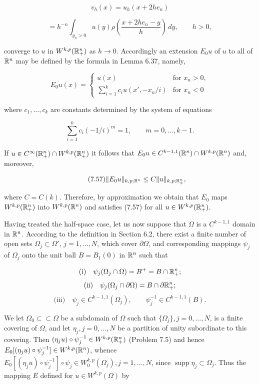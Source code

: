 \begin{equation}
\tag{7.55}
v_h(x) = u_h(x + 2he_n)
\end{equation}

\[
= h^{-n}\int_{y_n > 0} u(y)\rho\!\left(\frac{x + 2he_n - y}{h}\right)\,dy,\qquad h > 0,
\]

converge to $u$ in $W^{k,p}(\mathbb{R}_+^n)$ as $h \to 0$. Accordingly an extension $E_0u$ of $u$ to all of $\mathbb{R}^n$ may be defined by the formula in Lemma 6.37, namely,

\begin{equation}
\tag{7.56}
E_0u(x) =
\begin{cases}
u(x) & \text{for } x_n > 0,\\
\sum_{i=1}^k c_i u(x',-x_n/i) & \text{for } x_n < 0
\end{cases}
\end{equation}

where $c_1,\ldots,c_k$ are constants determined by the system of equations

\[
\sum_{i=1}^k c_i(-1/i)^m = 1,\qquad m = 0,\ldots,k-1.
\]

If $u \in C^\infty(\mathbb{R}_+^n)\cap W^{k,p}(\mathbb{R}_+^n)$ it follows that $E_0u \in C^{k-1,1}(\mathbb{R}^n)\cap W^{k,p}(\mathbb{R}^n)$ and, moreover,

\begin{equation}
\tag{7.57}
\|E_0u\|_{k,p;\mathbb{R}^n} \leq C\|u\|_{k,p;\mathbb{R}_+^n},
\end{equation}

where $C = C(k)$. Therefore, by approximation we obtain that $E_0$ maps $W^{k,p}(\mathbb{R}_+^n)$ into $W^{k,p}(\mathbb{R}^n)$ and satisfies (7.57) for all $u \in W^{k,p}(\mathbb{R}_+^n)$.

Having treated the half-space case, let us now suppose that $\Omega$ is a $C^{k-1,1}$ domain in $\mathbb{R}^n$. According to the definition in Section 6.2, there exist a finite number of open sets $\Omega_j \subset \Omega'$, $j = 1,\ldots,N$, which cover $\partial\Omega$, and corresponding mappings $\psi_j$ of $\Omega_j$ onto the unit ball $B = B_1(0)$ in $\mathbb{R}^n$ such that

\[
\text{(i)}\quad \psi_j(\Omega_j\cap\Omega) = B^+ = B \cap \mathbb{R}_+^n;
\]
\[
\text{(ii)}\quad \psi_j(\Omega_j\cap\partial\Omega) = B \cap \partial\mathbb{R}_+^n;
\]
\[
\text{(iii)}\quad \psi_j \in C^{k-1,1}(\Omega_j),\qquad \psi_j^{-1}\in C^{k-1,1}(B).
\]


We let $\Omega_0 \subset \subset \Omega$ be a subdomain of $\Omega$ such that $\{\Omega_j\}, j = 0, \dots , N$, is a finite covering of $\Omega$, and let $\eta_j, j = 0, \dots , N$ be a partition of unity subordinate to this covering. Then $(\eta_j u) \circ \psi_j^{-1} \in W^{k,p}(\mathbb{R}^n_+)$ (Problem 7.5) and hence $E_0[(\eta_j u) \circ \psi_j^{-1}] \in W^{k,p}(\mathbb{R}^n)$, whence $E_0[(\eta_j u) \circ \psi_j^{-1}] \circ \psi_j \in W^{k,p}_0(\Omega_j), j = 1, \dots , N$, since $\operatorname{supp}\eta_j \subset \Omega_j$. Thus the mapping $E$ defined for $u \in W^{k,p}(\Omega)$ by

